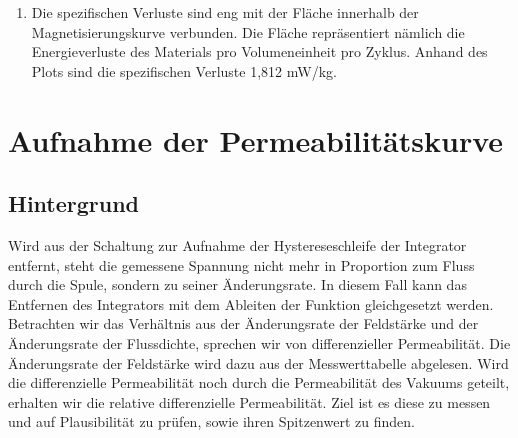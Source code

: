 \documentclass[a4paper,twoside,12pt,DIV=13,BCOR=5mm,numbers=noenddot,cleardoublepage=empty]{scrbook}
\begin{document}
\begin{enumerate}
            \\
            
            \item Die spezifischen Verluste sind eng mit der Fläche innerhalb der Magnetisierungskurve verbunden. Die Fläche repräsentiert nämlich die Energieverluste des Materials pro Volumeneinheit pro Zyklus. Anhand des Plots sind die spezifischen Verluste 1,812 mW/kg.
        
        \end{enumerate}
    

	\newpage


        \section{Aufnahme der Permeabilit\"atskurve}
        \subsection{Hintergrund}
        Wird aus der Schaltung zur Aufnahme der Hystereseschleife der Integrator entfernt, steht die gemessene Spannung nicht mehr in Proportion 
        zum Fluss durch die Spule, sondern zu seiner \"Anderungsrate. In diesem Fall kann das Entfernen des Integrators mit dem Ableiten der Funktion
        gleichgesetzt werden. Betrachten wir das Verh\"altnis aus der \"Anderungsrate der Feldst\"arke und der \"Anderungsrate der Flussdichte, sprechen wir von 
        differenzieller Permeabilit\"at. Die \"Anderungsrate der Feldstärke wird dazu aus der Messwerttabelle abgelesen. Wird die differenzielle Permeabilit\"at noch durch die Permeabilit\"at des Vakuums geteilt, erhalten wir die relative differenzielle Permeabilit\"at. Ziel ist es diese zu messen 
        und auf Plausibilit\"at zu pr\"ufen, sowie ihren Spitzenwert zu finden.
\end{document}
